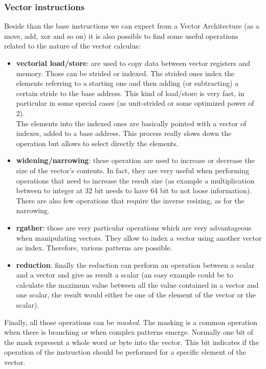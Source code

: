 \subsubsection{Vector instructions}
Beside than the base instructions we can expect from a Vector Architecture (as a move, add, xor and so on) it is also possible to find some useful operations related to the nature of the vector calculus\cite{riscv-v-specs}:
\begin{itemize}
    \item \textbf{vectorial load/store}: are used to copy data between vector registers and memory. Those can be strided or indexed. The strided ones index the elements referring to a starting one and then adding (or subtracting) a certain stride to the base address. This kind of load/store is very fast, in particular in some special cases (as unit-strided or some optimized power of 2).\\
    The elements into the indexed ones are basically pointed with a vector of indexes, added to a base address. This process really slows down the operation but allows to select directly the elements.
    
    \item \textbf{widening/narrowing}: these operation are used to increase or decrease the size of the vector's contents. In fact, they are very useful when performing operations that need to increase the result size (as example a multiplication between to integer at 32 bit needs to have 64 bit to not loose information). There are also few operations that require the inverse resizing, as for the narrowing.
    
    \item \textbf{rgather}: those are very particular operations which are very advantageous when manipulating vectors. They allow to index a vector using another vector as index. Therefore, various patterns are possible.
    
    \item \textbf{reduction}: finally the reduction can perform an operation between a scalar and a vector and give as result a scalar (an easy example could be to calculate the maximum value between all the value contained in a vector and one scalar, the result would either be one of the element of the vector or the scalar).
    
\end{itemize}


Finally, all those operations can be \textit{masked}. The masking is a common operation when there is branching or when complex patterns emerge.
Normally one bit of the mask represent a whole word or byte into the vector. This bit indicates if the operation of the instruction should be performed for a specific element of the vector.

